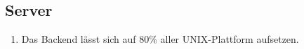 \subsection{Server}

\begin{enumerate}
    \item Das Backend lässt sich auf 80\% aller UNIX-Plattform aufsetzen.
\end{enumerate}